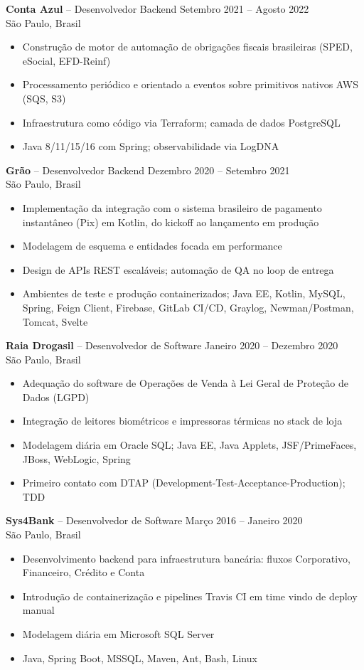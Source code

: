 \documentclass[10pt,a4paper]{article}
\begin{document}
\noindent\textbf{Conta Azul} -- Desenvolvedor Backend \hfill Setembro 2021 -- Agosto 2022\\
São Paulo, Brasil
\begin{itemize}
\item Construção de motor de automação de obrigações fiscais brasileiras (SPED, eSocial, EFD-Reinf)
\item Processamento periódico e orientado a eventos sobre primitivos nativos AWS (SQS, S3)
\item Infraestrutura como código via Terraform; camada de dados PostgreSQL
\item Java 8/11/15/16 com Spring; observabilidade via LogDNA
\end{itemize}

\noindent\textbf{Grão} -- Desenvolvedor Backend \hfill Dezembro 2020 -- Setembro 2021\\
São Paulo, Brasil
\begin{itemize}
\item Implementação da integração com o sistema brasileiro de pagamento instantâneo (Pix) em Kotlin, do kickoff ao lançamento em produção
\item Modelagem de esquema e entidades focada em performance
\item Design de APIs REST escaláveis; automação de QA no loop de entrega
\item Ambientes de teste e produção containerizados; Java EE, Kotlin, MySQL, Spring, Feign Client, Firebase, GitLab CI/CD, Graylog, Newman/Postman, Tomcat, Svelte
\end{itemize}

\noindent\textbf{Raia Drogasil} -- Desenvolvedor de Software \hfill Janeiro 2020 -- Dezembro 2020\\
São Paulo, Brasil
\begin{itemize}
\item Adequação do software de Operações de Venda à Lei Geral de Proteção de Dados (LGPD)
\item Integração de leitores biométricos e impressoras térmicas no stack de loja
\item Modelagem diária em Oracle SQL; Java EE, Java Applets, JSF/PrimeFaces, JBoss, WebLogic, Spring
\item Primeiro contato com DTAP (Development-Test-Acceptance-Production); TDD
\end{itemize}

\noindent\textbf{Sys4Bank} -- Desenvolvedor de Software \hfill Março 2016 -- Janeiro 2020\\
São Paulo, Brasil
\begin{itemize}
\item Desenvolvimento backend para infraestrutura bancária: fluxos Corporativo, Financeiro, Crédito e Conta
\item Introdução de containerização e pipelines Travis CI em time vindo de deploy manual
\item Modelagem diária em Microsoft SQL Server
\item Java, Spring Boot, MSSQL, Maven, Ant, Bash, Linux
\end{itemize}
\end{document}

